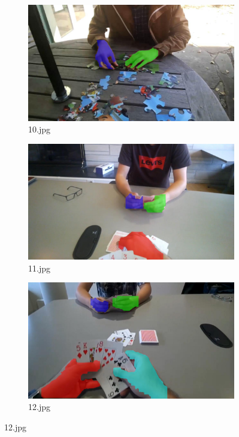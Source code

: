 \begin{figure}[!h]
\begin{subfigure}[b]{0.3\textwidth}
    \end{subfigure}
       
    \begin{subfigure}[b]{0.3 \textwidth}
        \centering
        \includegraphics[width=\textwidth]{images/handSegmentation/10.jpg}
        \caption{10.jpg}
        
    \end{subfigure}
    \hfill
    \begin{subfigure}[b]{0.3\textwidth}
        \centering
        \includegraphics[width=\textwidth]{images/handSegmentation/11.jpg}
        \caption{11.jpg}
        
    \end{subfigure}
    \hfill
    \begin{subfigure}[b]{0.3\textwidth}
        \centering
        \includegraphics[width=\textwidth]{images/handSegmentation/12.jpg}
        \caption{12.jpg}
        

\end{subfigure}
\end{figure}
